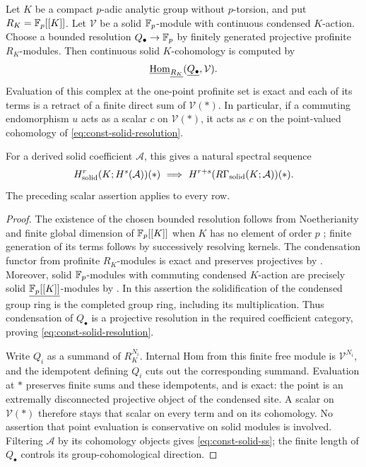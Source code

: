 \begin{lemma}
\label{lem:solid-rows}
Let $K$ be a compact $p$-adic analytic group without $p$-torsion, and put
$R_K=\mathbb F_p[[K]]$.  Let $\mathcal V$ be a solid $\mathbb F_p$-module with continuous
condensed $K$-action.  Choose a bounded resolution $Q_\bullet\to\mathbb F_p$ by
finitely generated projective profinite $R_K$-modules.  Then continuous
solid $K$-cohomology is computed by
\begin{equation}
 \underline{\operatorname{Hom}}_{\underline{R_K}}
           (\underline{Q_\bullet},\mathcal V).
 \label{eq:const-solid-resolution}
\end{equation}
Evaluation of this complex at the one-point profinite set is exact and
each of its terms is a retract of a finite direct sum of $\mathcal V(*)$.
In particular, if a commuting endomorphism $u$ acts as a scalar $c$ on
$\mathcal V(*)$, it acts as $c$ on the point-valued cohomology of
\eqref{eq:const-solid-resolution}.

For a derived solid coefficient $\mathcal A$, this gives a natural
spectral sequence
\begin{equation}
 H^r_{\mathrm{solid}}(K;H^s(\mathcal A))(*)
      \ \Longrightarrow\
 H^{r+s}(R\Gamma_{\mathrm{solid}}(K;\mathcal A))(*).
 \label{eq:const-solid-ss}
\end{equation}
The preceding scalar assertion applies to every row.
\end{lemma}

\begin{proof}
The existence of the chosen bounded resolution follows from
Noetherianity and finite global dimension of $\mathbb F_p[[K]]$ when $K$ has
no element of order $p$ \cite[Proposition~3.3]{ArdakovWadsley}; finite
generation of its terms follows by successively resolving kernels.
The condensation functor from profinite $R_K$-modules is exact and preserves
projectives by \cite[Theorems~3.2 and~3.14(i)]{Tang}.  Moreover, solid
$\mathbb F_p$-modules with commuting condensed $K$-action are precisely solid
$\underline{\mathbb F_p[[K]]}$-modules by
\cite[Proposition~3.21]{Tang}.  In this assertion the solidification of
the condensed group ring is the completed group ring, including its
multiplication.  Thus condensation of $Q_\bullet$ is a projective
resolution in the required coefficient category, proving
\eqref{eq:const-solid-resolution}.

Write $Q_i$ as a summand of $R_K^{N_i}$.  Internal Hom from this finite
free module is $\mathcal V^{N_i}$, and the idempotent defining $Q_i$
cuts out the corresponding summand.  Evaluation at $*$ preserves finite
sums and these idempotents, and is exact: the point is an extremally
disconnected projective object of the condensed site.  A scalar on
$\mathcal V(*)$ therefore stays that scalar on every term and on its
cohomology.  No assertion that point evaluation is conservative on solid
modules is involved.  Filtering $\mathcal A$ by its cohomology objects
gives \eqref{eq:const-solid-ss}; the finite length of $Q_\bullet$
controls its group-cohomological direction.
\end{proof}

